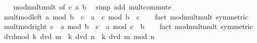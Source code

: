 \begin{isabellebody}
%
\isadelimproof
\ \ %
\endisadelimproof
%
\isatagproof
{}\isamarkupfalse%
\ mod{\isacharunderscore}{\kern0pt}mult{\isacharunderscore}{\kern0pt}mult{}\ {\isacharbrackleft}{\kern0pt}of\ c\ a\ b{\isacharbrackright}{\kern0pt}\ \isamarkupfalse%
\ {\isacharparenleft}{\kern0pt}simp\ add{\isacharcolon}{\kern0pt}\ mult{\isachardot}{\kern0pt}commute{\isacharparenright}{\kern0pt}%
\endisatagproof
{\isafoldproof}%
%
\isadelimproof
\isanewline
%
\endisadelimproof
\isanewline
{}\isamarkupfalse%
\ mult{\isacharunderscore}{\kern0pt}mod{\isacharunderscore}{\kern0pt}left{\isacharcolon}{\kern0pt}\ {\isachardoublequoteopen}{\isacharparenleft}{\kern0pt}a\ mod\ b{\isacharparenright}{\kern0pt}\ {\isacharasterisk}{\kern0pt}\ c\ {\isacharequal}{\kern0pt}\ {\isacharparenleft}{\kern0pt}a\ {\isacharasterisk}{\kern0pt}\ c{\isacharparenright}{\kern0pt}\ mod\ {\isacharparenleft}{\kern0pt}b\ {\isacharasterisk}{\kern0pt}\ c{\isacharparenright}{\kern0pt}{\isachardoublequoteclose}\isanewline
%
\isadelimproof
\ \ %
\endisadelimproof
%
\isatagproof
{}\isamarkupfalse%
\ {\isacharparenleft}{\kern0pt}fact\ mod{\isacharunderscore}{\kern0pt}mult{\isacharunderscore}{\kern0pt}mult{}\ {\isacharbrackleft}{\kern0pt}symmetric{\isacharbrackright}{\kern0pt}{\isacharparenright}{\kern0pt}%
\endisatagproof
{\isafoldproof}%
%
\isadelimproof
\isanewline
%
\endisadelimproof
\isanewline
{}\isamarkupfalse%
\ mult{\isacharunderscore}{\kern0pt}mod{\isacharunderscore}{\kern0pt}right{\isacharcolon}{\kern0pt}\ {\isachardoublequoteopen}c\ {\isacharasterisk}{\kern0pt}\ {\isacharparenleft}{\kern0pt}a\ mod\ b{\isacharparenright}{\kern0pt}\ {\isacharequal}{\kern0pt}\ {\isacharparenleft}{\kern0pt}c\ {\isacharasterisk}{\kern0pt}\ a{\isacharparenright}{\kern0pt}\ mod\ {\isacharparenleft}{\kern0pt}c\ {\isacharasterisk}{\kern0pt}\ b{\isacharparenright}{\kern0pt}{\isachardoublequoteclose}\isanewline
%
\isadelimproof
\ \ %
\endisadelimproof
%
\isatagproof
{}\isamarkupfalse%
\ {\isacharparenleft}{\kern0pt}fact\ mod{\isacharunderscore}{\kern0pt}mult{\isacharunderscore}{\kern0pt}mult{}\ {\isacharbrackleft}{\kern0pt}symmetric{\isacharbrackright}{\kern0pt}{\isacharparenright}{\kern0pt}%
\endisatagproof
{\isafoldproof}%
%
\isadelimproof
\isanewline
%
\endisadelimproof
\isanewline
{}\isamarkupfalse%
\ dvd{\isacharunderscore}{\kern0pt}mod{\isacharcolon}{\kern0pt}\ {\isachardoublequoteopen}k\ dvd\ m\ {\isasymLongrightarrow}\ k\ dvd\ n\ {\isasymLongrightarrow}\ k\ dvd\ {\isacharparenleft}{\kern0pt}m\ mod\ n{\isacharparenright}{\kern0pt}{\isachardoublequoteclose}\isanewline

\end{isabellebody}
